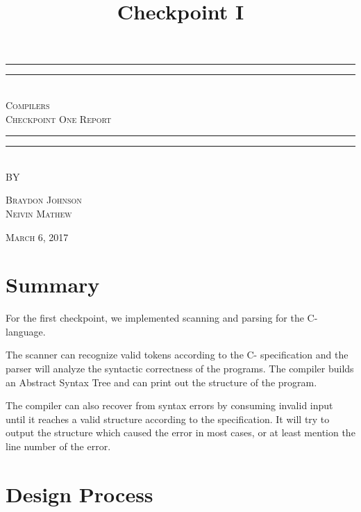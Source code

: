 \documentclass[12pt,letterpaper]{article}
\title{Checkpoint I}
\begin{document}
\begin{titlepage}
    \centering
    \vspace*{\baselineskip}
    \rule{\textwidth}{1.6pt}\vspace*{-\baselineskip}\vspace*{2pt}
    \rule{\textwidth}{0.4pt}\\[1.5\baselineskip]
    {\LARGE \textsc{Compilers \\ Checkpoint One Report}}\\[\baselineskip]
	\rule{\textwidth}{0.4pt}\vspace*{-\baselineskip}\vspace{4pt}    
    \rule{\textwidth}{2pt}\\[2\baselineskip]
   
    \vspace*{7\baselineskip}
    \textsc{BY}
    
    \vspace*{0.25\baselineskip}
    {\textsc{Braydon Johnson \\ Neivin Mathew} \par}
    \vfill
    {\scshape March 6, 2017} \\
  \end{titlepage}
  
  
\tableofcontents
\lhead{} %
\clearpage
{} %
    
\section{Summary}
For the first checkpoint, we implemented scanning and parsing for the C- language.

The scanner can recognize valid tokens according to the C- specification and the parser will analyze the syntactic correctness of the programs. The compiler builds an Abstract Syntax Tree and can print out the structure of the program.

The compiler can also recover from syntax errors by consuming invalid input until it reaches a valid structure according to the specification. It will try to output the structure which caused the error in most cases, or at least mention the line number of the error.

\section{Design Process}
\end{document}
